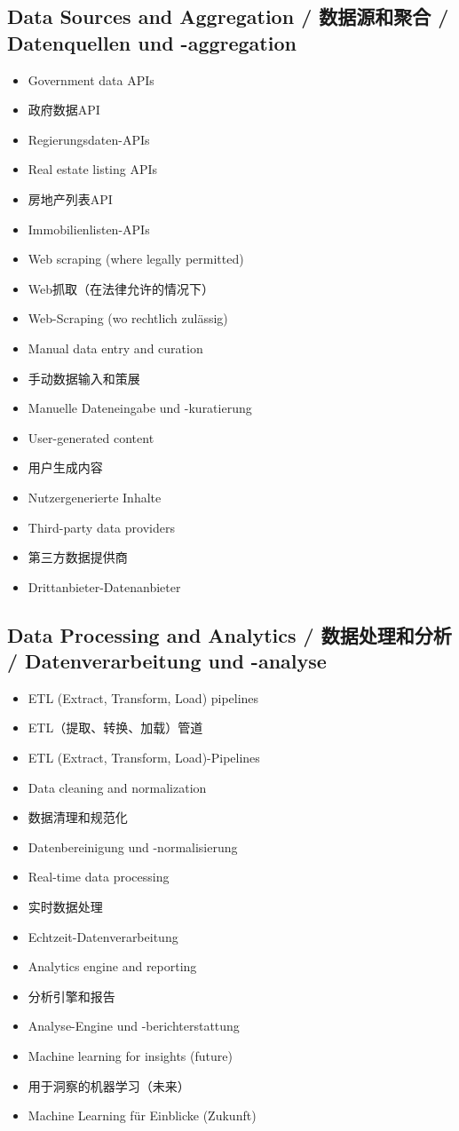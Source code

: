 \subsection{Data Sources and Aggregation / 数据源和聚合 / Datenquellen und -aggregation}
\begin{itemize}
    \item Government data APIs
    \item 政府数据API
    \item Regierungsdaten-APIs
    \item Real estate listing APIs
    \item 房地产列表API
    \item Immobilienlisten-APIs
    \item Web scraping (where legally permitted)
    \item Web抓取（在法律允许的情况下）
    \item Web-Scraping (wo rechtlich zulässig)
    \item Manual data entry and curation
    \item 手动数据输入和策展
    \item Manuelle Dateneingabe und -kuratierung
    \item User-generated content
    \item 用户生成内容
    \item Nutzergenerierte Inhalte
    \item Third-party data providers
    \item 第三方数据提供商
    \item Drittanbieter-Datenanbieter
\end{itemize}

\subsection{Data Processing and Analytics / 数据处理和分析 / Datenverarbeitung und -analyse}
\begin{itemize}
    \item ETL (Extract, Transform, Load) pipelines
    \item ETL（提取、转换、加载）管道
    \item ETL (Extract, Transform, Load)-Pipelines
    \item Data cleaning and normalization
    \item 数据清理和规范化
    \item Datenbereinigung und -normalisierung
    \item Real-time data processing
    \item 实时数据处理
    \item Echtzeit-Datenverarbeitung
    \item Analytics engine and reporting
    \item 分析引擎和报告
    \item Analyse-Engine und -berichterstattung
    \item Machine learning for insights (future)
    \item 用于洞察的机器学习（未来）
    \item Machine Learning für Einblicke (Zukunft)
\end{itemize}

